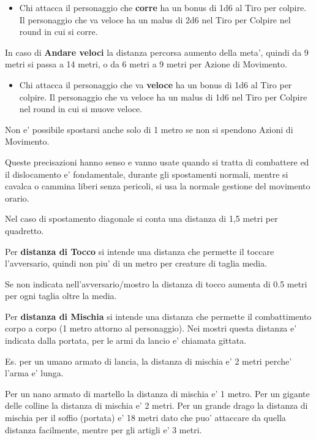 \documentclass[a4paper,11pt,twoside,openany]{book}
\begin{document}
\begin{itemize}
	\item Chi attacca il personaggio che \textbf{corre} ha un bonus di 1d6 al Tiro per colpire. Il personaggio che va veloce ha un malus di 2d6 nel Tiro per Colpire nel round in cui si corre.
\end{itemize}

In caso di \textbf{Andare veloci} la distanza percorsa aumento della meta', quindi da 9 metri si passa a 14 metri, o da 6 metri a 9 metri per Azione di Movimento.

\begin{itemize}
	\item Chi attacca il personaggio che va \textbf{veloce} ha un bonus di 1d6 al Tiro per colpire. Il personaggio che va veloce ha un malus di 1d6 nel Tiro per Colpire nel round in cui si muove veloce.
\end{itemize}

Non e' possibile spostarsi anche solo di 1 metro se non si spendono Azioni di Movimento.

Queste precisazioni hanno senso e vanno usate quando si tratta di combattere ed il dislocamento e' fondamentale, durante gli spostamenti normali, mentre si cavalca o cammina liberi senza pericoli, si usa la normale gestione del movimento orario.

Nel caso di spostamento diagonale si conta una distanza di 1,5 metri per quadretto.

Per \textbf{distanza di Tocco}  si intende una distanza che permette il toccare l'avversario, quindi non piu' di un metro per creature di taglia media.

Se non indicata nell'avversario/mostro la distanza di tocco aumenta di 0.5 metri per ogni taglia oltre la media.

Per \textbf{distanza di Mischia}  si intende una distanza che permette il combattimento corpo a corpo (1 metro attorno al personaggio). Nei mostri questa distanza e' indicata dalla portata, per le armi da lancio e' chiamata gittata.

Es. per un umano armato di lancia, la distanza di mischia e' 2 metri perche' l'arma e' lunga.

Per un nano armato di martello la distanza di mischia e' 1 metro. Per un gigante delle colline la distanza di mischia e' 2 metri. Per un grande drago la distanza di mischia per il soffio (portata) e' 18 metri dato che puo' attaccare da quella distanza facilmente, mentre per gli artigli e' 3 metri.
\end{document}
